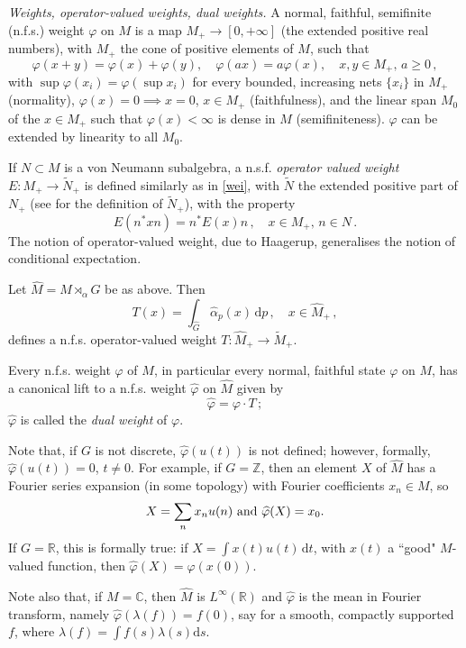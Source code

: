 \documentclass[11pt,a4paper]{article}
\def\be{\begin{equation}}
\def\ee{\end{equation}}
\def\hat{\widehat}
\def\tilde{\widetilde}
\def\d{{\mathrm d}}
\def\C{{\mathbb C}}
\def\l{\langle}
\def\tilde{\widetilde}
\def\hat{\widehat}
\def\f{\varphi}
\def\l{\lambda}
\def\al{\alpha}
\begin{document}
\noindent
{\it Weights, operator-valued weights, dual weights.} 
A normal, faithful, semifinite  (n.f.s.) weight $\f$ on $M$ is a map $M_+\to [0,+\infty]$ (the extended positive real numbers), with $M_+$ the cone of positive elements of $M$, such that
\begin{equation}\label{wei}
\f(x+y) = \f(x) + \f(y),\quad \f(ax) = a\f(x),\quad x,y\in 
M_+,\, a\geq 0\,,
\end{equation}
with $\sup \f(x_i) = \f(\sup x_i)$ for every bounded, increasing nets $\{x_i\}$ in $M_+$ 
(normality), $\f(x) = 0 \implies x=0$, $x\in M_+$ (faithfulness), and
the linear span $M_0$ of the $x\in M_+$ such that $\f(x) < \infty$ is dense in $M$ (semifiniteness). $\f$ can be extended by linearity to all $M_0$. 

If $N\subset M$ is a von Neumann subalgebra, a n.s.f. {\it operator valued weight} $E: M_+ \to \tilde N_+$ is defined similarly as in \eqref{wei}, with $\tilde N$ the extended positive part of $N_+$ 
(see \cite{T} for the definition of $\tilde N_+$), with the property
\be
E(n^*xn) = n^* E(x) n\, ,\quad x\in M_+,\, n\in N\, .
\ee
The notion of operator-valued weight, due to Haagerup, generalises the notion of conditional expectation.  

Let $\hat M = M\rtimes_\al G$ be as above. Then
\be
T(x) = \int_{\hat G} \hat\al_p(x)\,{\mathrm d}p\, ,\quad x\in \hat M_+\, ,
\ee
defines a n.f.s. operator-valued weight $T: \hat M_+ \to \tilde M_+$.

Every n.f.s. weight $\f$ of $M$, in particular every normal, faithful state $\f$ on $M$, has a canonical lift to a n.f.s. weight $\hat \f$ on $\hat M$
given by
\be
\hat \f = \f\cdot T \, ;
\ee
$\hat \f$ is called the {\it dual weight} of $\f$. 

Note that, if $G$ is not discrete, $\hat\f(u(t))$ is not defined; however, formally, $\hat\f(u(t))= 0$, $t\neq 0$. 
For example, if $G = \mathbb Z$, then an element $X$ of $\hat M$ has a Fourier series expansion (in some topology)
with Fourier coefficients $x_n\in M$, so
\be
X = \sum_n x_n u(n)\ {\rm and} \ \hat\f(X) = x_0. 
\ee
If $G = \mathbb R$, this is formally true: if $ X = \int x(t)u(t)\,{\mathrm d}t$, with $x(t)$ a ``good" $M$-valued function, then $\hat\f(X) = \f(x(0))$. 

Note also that, if $M = \C$, then $\hat M$ is $L^\infty(\mathbb R)$ and $\hat \f$  is the mean in Fourier transform, namely $\hat\f(\lambda(f)) = f(0)$, say for a smooth, compactly supported $f$, where $\l(f) = \int f(s)\l(s)\d s$. 
\end{document}
